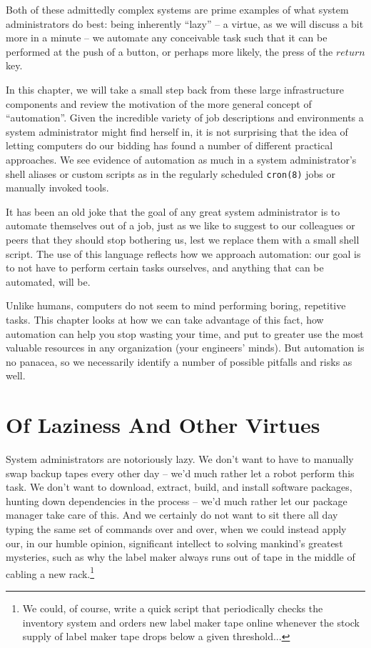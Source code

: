 Both of these admittedly complex systems are prime
examples of what system administrators do best: being
inherently ``lazy'' -- a virtue, as we will discuss a
bit more in a minute -- we automate any conceivable
task such that it can be performed at the push of a
button, or perhaps more likely, the press of the
$return$ key.

In this chapter, we will take a small step back
from these large infrastructure components and review
the motivation of the more general concept of
``automation''.  Given the incredible variety of job
descriptions and environments a system administrator
might find herself in, it is not surprising that
the idea of letting computers do our bidding has found
a number of different practical approaches.  We see
evidence of automation as much in a system
administrator's shell aliases or custom scripts as in
the regularly scheduled {\tt cron(8)} jobs or manually invoked tools.

It has been an old joke that the goal of any great
system administrator is to automate themselves out of
a job, just as we like to suggest to our colleagues or
peers that they should stop bothering us, lest we
replace them with a small shell script.  The use of
this language reflects how we approach automation: our
goal is to not have to perform certain tasks
ourselves, and anything that can be automated, will
be.

Unlike humans, computers do not seem to mind
performing boring, repetitive tasks.  This chapter
looks at how we can take advantage of this fact, how
automation can help you stop wasting your time, and
put to greater use the most valuable resources in any
organization (your engineers' minds). But automation
is no panacea, so we necessarily identify a number of
possible pitfalls and risks as well.

\section{Of Laziness And Other Virtues}
\label{automation:laziness}

System administrators are notoriously lazy.  We don't
want to have to manually swap backup tapes every other
day -- we'd much rather let a robot perform this task.
We don't want to download, extract, build, and install
software packages, hunting down dependencies in the
process -- we'd much rather let our package manager
take care of this.  And we certainly do not want to
sit there all day typing the same set of commands over
and over, when we could instead apply our, in our
humble opinion, significant intellect to solving
mankind's greatest mysteries, such as why the label
maker always runs out of tape in the middle of cabling
a new rack.\footnote{We could, of course, write a quick
script that periodically checks the inventory system
and orders new label maker tape online whenever the
stock supply of label maker tape drops below a given
threshold...}

